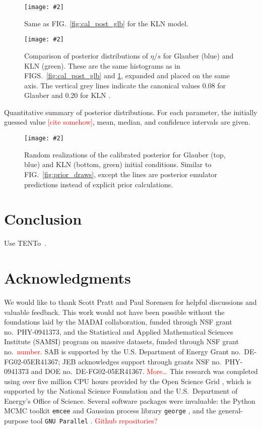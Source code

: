 \documentclass[aps,prc,reprint,amsmath]{revtex4-1}
\newcommand{\todo}[1]{\textcolor{red}{#1}}
\newcommand{\colfig}[3][t]{
  \begin{figure}[#1]
    \texttt{[image: \#2]}
    \caption{\label{fig:#2}#3}
  \end{figure}
}
\newcommand{\widefig}[3][t]{
  \begin{figure*}[#1]
    \texttt{[image: \#2]}
    \caption{\label{fig:#2}#3}
  \end{figure*}
}
\newcommand{\trento}{T\raisebox{-.5ex}{R}ENTo}
\begin{document}
\widefig{cal_post_kln}{
  Same as FIG.~\ref{fig:cal_post_glb} for the KLN model.
}

\colfig{post_compare}{
  Comparison of posterior distributions of $\eta/s$ for Glauber (blue) and KLN (green).
  These are the same histograms as in FIGS.~\ref{fig:cal_post_glb} and \ref{fig:cal_post_kln}, expanded and placed on the same axis.
  The vertical grey lines indicate the canonical values 0.08 for Glauber and 0.20 for KLN \cite{}.
}

\begin{table*}
  \caption{
    \label{tab:posterior}
    Quantitative summary of posterior distributions.
    For each parameter, the initially guessed value \todo{[cite somehow]}, mean, median, and confidence intervals are given.
  }
  
\end{table*}

\widefig{post_draws}{
  Random realizations of the calibrated posterior for Glauber (top, blue) and KLN (bottom, green) initial conditions.
  Similar to FIG.~\ref{fig:prior_draws},
  except the lines are posterior emulator predictions instead of explicit prior calculations.
}



\section{Conclusion}

Use \trento\ \cite{Moreland:2014oya}.


\section*{Acknowledgments}

We would like to thank Scott Pratt and Paul Sorensen for helpful discussions and valuable feedback.
This work would not have been possible without the foundations laid by the MADAI collaboration, funded through NSF grant no.~PHY-0941373, and the Statistical and Applied Mathematical Sciences Institute (SAMSI) program on massive datasets, funded through NSF grant no.~\todo{number}.
SAB is supported by the U.S. Department of Energy Grant no.~DE-FG02-05ER41367; JEB acknowledges support through grants NSF no.~PHY-0941373 and DOE no.~DE-FG02-05ER41367.
\todo{More\ldots}
This research was completed using over five million CPU hours provided by the Open Science Grid \cite{Pordes:2007zzb,Sfiligoi:2010zz}, which is supported by the National Science Foundation and the U.S.\ Department of Energy's Office of Science.
Several software packages were invaluable:
the Python MCMC toolkit \texttt{emcee} \cite{FM:2013mc} and Gaussian process library \texttt{george} \cite{Ambikasaran:2014gp}, and the general-purpose tool \texttt{GNU Parallel} \cite{Tange:2011pa}.
\todo{Github repositories?}
\end{document}

